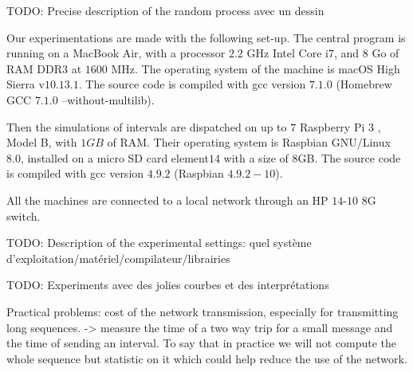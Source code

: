 \documentclass[a4paper,10pt]{article}
\newcommand{\todo}[1]{{\color{red} TODO: {#1}}}
\begin{document}
\todo{ Precise description of the random process avec un dessin}

Our experimentations are made with the following set-up.
The central program is running on a MacBook Air, with a processor $2.2$ GHz Intel Core i$7$, and $8$ Go of RAM DDR$3$ at $1600$ MHz. The operating system of the machine is macOS High Sierra v$10.13.1$. The source code is compiled with  gcc version $7.1.0$ (Homebrew GCC $7.1.0$ --without-multilib).

Then the simulations of intervals are dispatched on up to $7$ Raspberry Pi 3 , Model B, with $1GB$ of RAM. Their operating system is  Raspbian GNU/Linux $8.0$, installed on a micro SD card element$14$ with a size of $8$GB. The source code is compiled with gcc version $4.9.2$ (Raspbian $4.9.2-10$).

All the machines are connected to a local network through an HP $14$-$10$ $8$G switch.

\todo{Description of the experimental settings: quel système d'exploitation/matériel/compilateur/librairies}

\todo{Experiments avec des jolies courbes et des interprétations}


Practical problems: cost of the network transmission, especially for transmitting long sequences.
-> measure the time of a two way trip for a small message and the time of sending an interval.
To say that in practice we will not compute the whole sequence but statistic on it which could help
reduce the use of the network.
\end{document}
